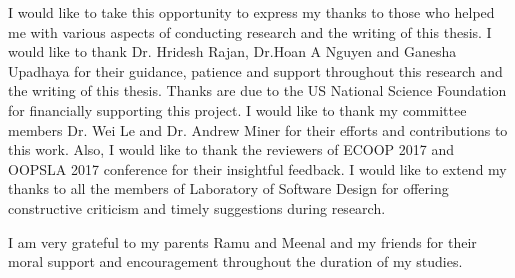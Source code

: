 I would like to take this opportunity to express my thanks to those who helped me with various
aspects of conducting research and the writing of this thesis. I would like to thank Dr. Hridesh Rajan, Dr.Hoan A Nguyen and Ganesha Upadhaya
for their guidance, patience and support throughout this research and the writing of this thesis. Thanks
are due to the US National Science Foundation for financially supporting this project.
I would like to thank my committee members Dr. Wei Le and Dr. Andrew Miner for their
efforts and contributions to this work. Also, I would like to thank the reviewers of ECOOP 2017 and OOPSLA 2017 conference for their insightful feedback. I would like to extend my thanks to all the members of Laboratory of Software Design for offering constructive criticism and timely suggestions
during research.
\par I am very grateful to my parents Ramu and Meenal and my friends for their moral support and encouragement throughout the duration of my studies.